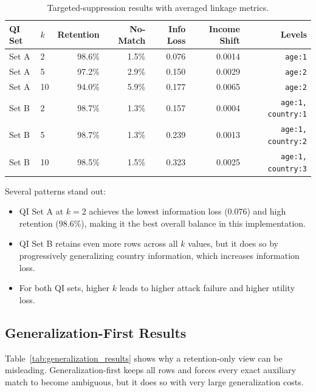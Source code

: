 \documentclass[11pt]{article}
\begin{document}
\begin{table}[H]
\centering
\small
\begin{tabular}{llrrrrr}
\toprule
\textbf{QI Set} & \textbf{$k$} & \textbf{Retention} & \textbf{No-Match} & \textbf{Info Loss} & \textbf{Income Shift} & \textbf{Levels} \\
\midrule
Set A & 2 & 98.6\% & 1.5\% & 0.076 & 0.0014 & \texttt{age:1} \\
Set A & 5 & 97.2\% & 2.9\% & 0.150 & 0.0029 & \texttt{age:2} \\
Set A & 10 & 94.0\% & 5.9\% & 0.177 & 0.0065 & \texttt{age:2} \\
Set B & 2 & 98.7\% & 1.3\% & 0.157 & 0.0004 & \texttt{age:1, country:1} \\
Set B & 5 & 98.7\% & 1.3\% & 0.239 & 0.0013 & \texttt{age:1, country:2} \\
Set B & 10 & 98.5\% & 1.5\% & 0.323 & 0.0025 & \texttt{age:1, country:3} \\
\bottomrule
\end{tabular}
\caption{Targeted-suppression results with averaged linkage metrics.}
\label{tab:targeted_results}
\end{table}

Several patterns stand out:
\begin{itemize}[leftmargin=*]
    \item QI Set A at $k=2$ achieves the lowest information loss (0.076) and high retention (98.6\%), making it the best overall balance in this implementation.
    \item QI Set B retains even more rows across all $k$ values, but it does so by progressively generalizing country information, which increases information loss.
    \item For both QI sets, higher $k$ leads to higher attack failure and higher utility loss.
\end{itemize}

\subsection{Generalization-First Results}
Table~\ref{tab:generalization_results} shows why a retention-only view can be misleading. Generalization-first keeps all rows and forces every exact auxiliary match to become ambiguous, but it does so with very large generalization costs.
\end{document}
